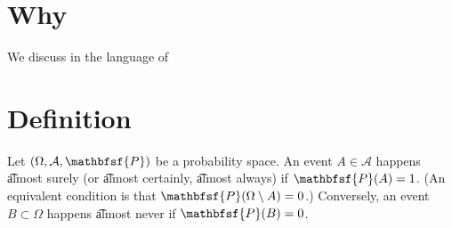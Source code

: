 

\section*{Why}

We discuss in the language of 

\section*{Definition}

Let $(\Omega , \mathcal{A} , \mathbfsf{P} )$ be a probability space.
An event $A \in \mathcal{A} $ happens \t{almost surely} (or \t{almost certainly}, \t{almost always}) if $\mathbfsf{P} (A) = 1$.
(An equivalent condition is that $\mathbfsf{P} (\Omega  \setminus A) = 0$.)
Conversely, an event $B \subset \Omega $ happens \t{almost never} if $\mathbfsf{P} (B) = 0$.

\blankpage